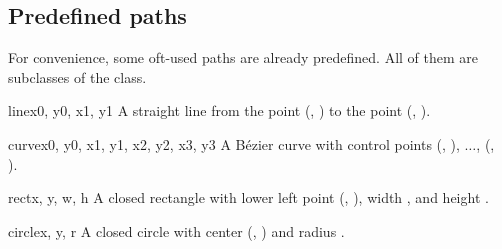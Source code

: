 \subsection{Predefined paths}

\label{path:predefined}

For convenience, some oft-used paths are already predefined. All
of them are subclasses of the  class. 

\begin{classdesc}{line}{x0, y0, x1, y1}
A straight line from the point (, ) to the point (, ). 
\end{classdesc}

\begin{classdesc}{curve}{x0, y0, x1, y1, x2, y2, x3, y3}
A B\'ezier curve with 
control points  (, ), $\dots$, (, ).\
\end{classdesc}

\begin{classdesc}{rect}{x, y, w, h}
A closed rectangle with lower left point (, ), width , and
  height \var{h}. 
\end{classdesc}

\begin{classdesc}{circle}{x, y, r}
A closed circle with center (, ) and radius . 
\end{classdesc}

